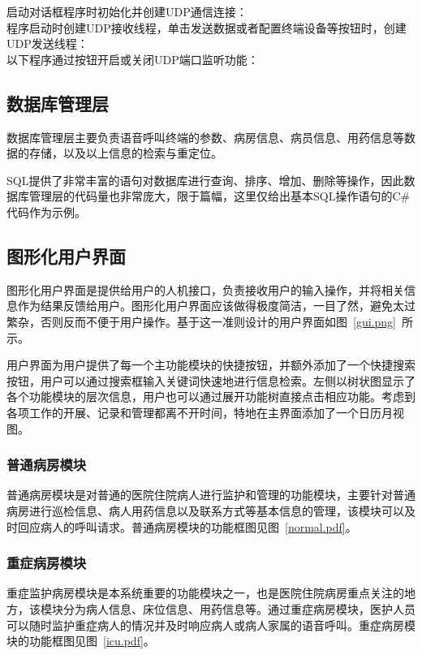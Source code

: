 启动对话框程序时初始化并创建UDP通信连接：\\


程序启动时创建UDP接收线程，单击发送数据或者配置终端设备等按钮时，创建UDP发送线程：\\


以下程序通过按钮开启或关闭UDP端口监听功能：\\


\subsection{数据库管理层}
数据库管理层主要负责语音呼叫终端的参数、病房信息、病员信息、用药信息等数据的存储，以及以上信息的检索与重定位。

SQL提供了非常丰富的语句对数据库进行查询、排序、增加、删除等操作，因此数据库管理层的代码量也非常庞大，限于篇幅，这里仅给出基本SQL操作语句的C{\#}代码作为示例。\\


\subsection{图形化用户界面}
图形化用户界面是提供给用户的人机接口，负责接收用户的输入操作，并将相关信息作为结果反馈给用户。图形化用户界面应该做得极度简洁，一目了然，避免太过繁杂，否则反而不便于用户操作。基于这一准则设计的用户界面如图~\ref{gui.png}~所示。

用户界面为用户提供了每一个主功能模块的快捷按钮，并额外添加了一个快捷搜索按钮，用户可以通过搜索框输入关键词快速地进行信息检索。左侧以树状图显示了各个功能模块的层次信息，用户也可以通过展开功能树直接点击相应功能。考虑到各项工作的开展、记录和管理都离不开时间，特地在主界面添加了一个日历月视图。

\subsubsection{普通病房模块}
普通病房模块是对普通的医院住院病人进行监护和管理的功能模块，主要针对普通病房进行巡检信息、病人用药信息以及联系方式等基本信息的管理，该模块可以及时回应病人的呼叫请求。普通病房模块的功能框图见图~\ref{normal.pdf}。

\subsubsection{重症病房模块}
重症监护病房模块是本系统重要的功能模块之一，也是医院住院病房重点关注的地方，该模块分为病人信息、床位信息、用药信息等。通过重症病房模块，医护人员可以随时监护重症病人的情况并及时响应病人或病人家属的语音呼叫。重症病房模块的功能框图见图~\ref{icu.pdf}。

